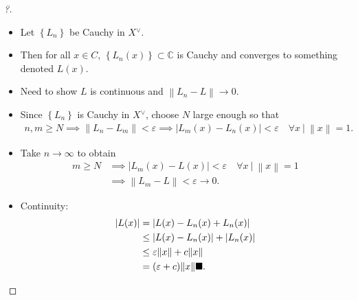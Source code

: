 \begin{proof}[?]

\envlist

\begin{itemize}
\item
  Let \(\left\{{L_{n}}\right\}\) be Cauchy in \(X {}^{ \vee }\).
\item
  Then for all \(x\in C\),
  \(\left\{{L_{n}(x)}\right\} \subset {\mathbb{C}}\) is Cauchy and
  converges to something denoted \(L(x)\).
\item
  Need to show \(L\) is continuous and
  \({\left\lVert {L_{n} - L} \right\rVert} \to 0\).
\item
  Since \(\left\{{L_{n}}\right\}\) is Cauchy in \(X {}^{ \vee }\),
  choose \(N\) large enough so that
  \begin{align*}
  n, m \geq N \implies {\left\lVert {L_{n} - L_{m}} \right\rVert} < \varepsilon \implies {\left\lvert {L_{m}(x) - L_{n}(x)} \right\rvert} < \varepsilon \quad \forall x {~\mathrel{\Big|}~}{\left\lVert {x} \right\rVert} = 1
  .\end{align*}
\item
  Take \(n\to \infty\) to obtain
  \begin{align*}m \geq N 
  &\implies {\left\lvert {L_{m}(x) - L(x)} \right\rvert} < \varepsilon \quad \forall x {~\mathrel{\Big|}~}{\left\lVert {x} \right\rVert} = 1\\
  &\implies {\left\lVert {L_{m} - L} \right\rVert} < \varepsilon \to 0
  .\end{align*}
\item
  Continuity:
  \begin{align*}
  {\left\lvert {L(x)} \right\rvert} &= {\left\lvert {L(x) - L_{n}(x) + L_{n}(x)} \right\rvert} \\
  &\leq  {\left\lvert {L(x) - L_{n}(x)} \right\rvert} + {\left\lvert {L_{n}(x)} \right\rvert} \\
  &\leq \varepsilon {\left\lVert {x} \right\rVert} + c{\left\lVert {x} \right\rVert} \\
  &= (\varepsilon + c){\left\lVert {x} \right\rVert} \hfill\blacksquare
  .\end{align*}
\end{itemize}

\end{proof}

